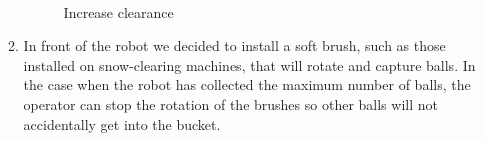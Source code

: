 \begin{enumerate}
\begin{enumerate}
      \begin{figure}[H]
      	\begin{minipage}[h]{1\linewidth}
      		\caption{Increase clearance} 
      	\end{minipage}
      \end{figure}
        
      \item In front of the robot we decided to install a soft brush, such as those installed on snow-clearing machines, that will rotate and capture balls. In the case when the robot has collected the maximum number of balls, the operator can stop the rotation of the brushes so other balls will not accidentally get into the bucket.
      

\end{enumerate}
\end{enumerate}
